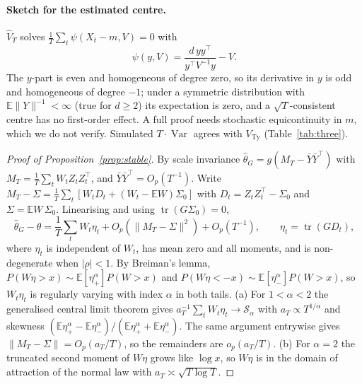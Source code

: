 \documentclass[11pt]{article}
\newcommand{\E}{\mathbb{E}}
\newcommand{\Var}{\operatorname{Var}}
\newcommand{\tr}{\operatorname{tr}}
\theoremstyle{remark}
\begin{document}
\paragraph{Sketch for the estimated centre.}
$\hat V_T$ solves $\frac1T\sum_t\psi(X_t-m,V)=0$ with
\[
\psi(y,V)=\frac{d\,yy^\top}{y^\top V^{-1}y}-V .
\]
The $y$-part
is even and homogeneous of degree zero, so its derivative in $y$ is odd and homogeneous of degree $-1$; under a
symmetric distribution with $\E\|Y\|^{-1}<\infty$ (true for $d\ge2$) its expectation is zero, and a
$\sqrt T$-consistent centre has no first-order effect. A full proof needs stochastic equicontinuity in $m$,
which we do not verify. Simulated $T\cdot\Var$ agrees with $V_{\mathrm{Ty}}$ (Table~\ref{tab:three}).

\begin{proof}[Proof of Proposition~\ref{prop:stable}]
By scale invariance $\hat\theta_G=g(M_T-\bar Y\bar Y^\top)$ with $M_T=\frac1T\sum_tW_tZ_tZ_t^\top$, and
$\bar Y\bar Y^\top=O_p(T^{-1})$. Write $M_T-\Sigma=\frac1T\sum_t[W_tD_t+(W_t-\E W)\Sigma_0]$ with
$D_t=Z_tZ_t^\top-\Sigma_0$ and $\Sigma=\E W\,\Sigma_0$. Linearising and using $\tr(G\Sigma_0)=0$,
\[
\hat\theta_G-\theta=\frac1T\sum_tW_t\eta_t+O_p(\|M_T-\Sigma\|^2)+O_p(T^{-1}),\qquad\eta_t=\tr(GD_t),
\]
where $\eta_t$ is independent of $W_t$, has mean zero and all moments, and is non-degenerate when $|\rho|<1$. By
Breiman's lemma, $P(W\eta>x)\sim\E[\eta_+^\alpha]P(W>x)$ and $P(W\eta<-x)\sim\E[\eta_-^\alpha]P(W>x)$, so
$W_t\eta_t$ is regularly varying with index $\alpha$ in both tails. (a) For $1<\alpha<2$ the generalised central
limit theorem \citep[Ch.~XVII]{feller1971} gives $a_T^{-1}\sum_tW_t\eta_t\to\mathcal S_\alpha$ with
$a_T\propto T^{1/\alpha}$ and skewness $(\E\eta_+^\alpha-\E\eta_-^\alpha)/(\E\eta_+^\alpha+\E\eta_-^\alpha)$. The same
argument entrywise gives $\|M_T-\Sigma\|=O_p(a_T/T)$, so the remainders are $o_p(a_T/T)$. (b) For $\alpha=2$ the
truncated second moment of $W\eta$ grows like $\log x$, so $W\eta$ is in the domain of attraction of the normal
law with $a_T\asymp\sqrt{T\log T}$.
\end{proof}
\end{document}
